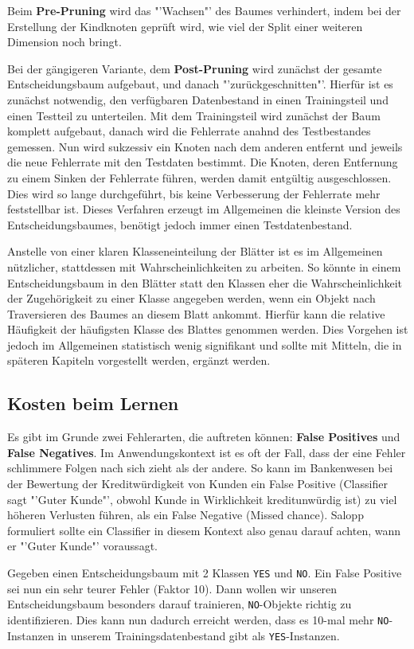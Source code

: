 Beim \textbf{Pre-Pruning} wird das "'Wachsen"' des Baumes verhindert, indem bei der
Erstellung der Kindknoten geprüft wird, wie viel der Split einer weiteren Dimension
noch bringt. 

Bei der gängigeren Variante, dem \textbf{Post-Pruning} wird zunächst der gesamte
Entscheidungsbaum aufgebaut, und danach "'zurückgeschnitten"'. Hierfür ist es
zunächst notwendig, den verfügbaren Datenbestand in einen Trainingsteil und einen
Testteil zu unterteilen. Mit dem Trainingsteil wird zunächst der Baum komplett
aufgebaut, danach wird die Fehlerrate anahnd des Testbestandes gemessen. Nun wird
sukzessiv ein Knoten nach dem anderen entfernt und jeweils die neue Fehlerrate mit den
Testdaten bestimmt. Die Knoten, deren Entfernung zu einem Sinken der Fehlerrate führen,
werden damit entgültig ausgeschlossen. Dies wird so lange durchgeführt, bis keine
Verbesserung der Fehlerrate mehr feststellbar ist. Dieses Verfahren erzeugt im
Allgemeinen die kleinste Version des Entscheidungsbaumes, benötigt jedoch immer
einen Testdatenbestand.

Anstelle von einer klaren Klasseneinteilung der Blätter ist es im Allgemeinen
nützlicher, stattdessen mit Wahrscheinlichkeiten zu arbeiten. So könnte in
einem Entscheidungsbaum in den Blätter statt den Klassen eher die Wahrscheinlichkeit
der Zugehörigkeit zu einer Klasse angegeben werden, wenn ein Objekt nach Traversieren
des Baumes an diesem Blatt ankommt. Hierfür kann die relative Häufigkeit der 
häufigsten Klasse des Blattes genommen werden. Dies Vorgehen ist jedoch
im Allgemeinen statistisch wenig signifikant und sollte mit Mitteln, die in 
späteren Kapiteln vorgestellt werden, ergänzt werden.

\subsection{Kosten beim Lernen}
Es gibt im Grunde zwei Fehlerarten, die auftreten können: \textbf{False Positives} 
und \textbf{False Negatives}. Im Anwendungskontext ist es oft der Fall, dass der
eine Fehler schlimmere Folgen nach sich zieht als der andere. So kann im 
Bankenwesen bei der Bewertung der Kreditwürdigkeit von Kunden ein False Positive
(Classifier sagt "'Guter Kunde"', obwohl Kunde in Wirklichkeit kreditunwürdig ist)
zu viel höheren Verlusten führen, als ein False Negative (Missed chance). Salopp
formuliert sollte ein Classifier in diesem Kontext also genau darauf achten,
wann er "'Guter Kunde"' voraussagt.

Gegeben einen Entscheidungsbaum mit 2 Klassen \texttt{YES} und \texttt{NO}. Ein
False Positive sei nun ein sehr teurer Fehler (Faktor 10). Dann wollen wir unseren
Entscheidungsbaum besonders darauf trainieren, \texttt{NO}-Objekte richtig zu
identifizieren. Dies kann nun dadurch erreicht werden, dass es 10-mal mehr 
\texttt{NO}-Instanzen in unserem Trainingsdatenbestand gibt als \texttt{YES}-Instanzen.

